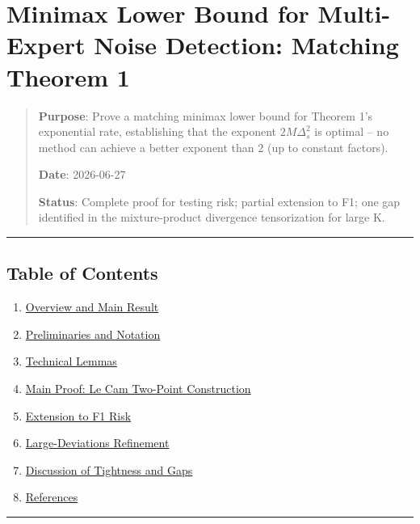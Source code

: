 \documentclass[
  12pt,
]{ctexart}
\author{SCX}
\date{2026}
\providecommand{\tightlist}{%
  \setlength{\itemsep}{0pt}\setlength{\parskip}{0pt}}
\begin{document}
\section{Minimax Lower Bound for Multi-Expert Noise Detection: Matching
Theorem
1}\label{minimax-lower-bound-for-multi-expert-noise-detection-matching-theorem-1}

\begin{quote}
\textbf{Purpose}: Prove a matching minimax lower bound for Theorem 1's
exponential rate, establishing that the exponent \(2M\Delta_s^2\) is
optimal -- no method can achieve a better exponent than \(2\) (up to
constant factors).

\textbf{Date}: 2026-06-27

\textbf{Status}: Complete proof for testing risk; partial extension to
F1; one gap identified in the mixture-product divergence tensorization
for large K.
\end{quote}

\begin{center}\rule{0.5\linewidth}{0.5pt}\end{center}

\subsection{Table of Contents}\label{table-of-contents}

\begin{enumerate}
\def\labelenumi{\arabic{enumi}.}
\tightlist
\item
  \hyperref[1-overview-and-main-result]{Overview and Main Result}
\item
  \hyperref[2-preliminaries-and-notation]{Preliminaries and Notation}
\item
  \hyperref[3-technical-lemmas]{Technical Lemmas}
\item
  \hyperref[4-main-proof-le-cam-two-point-construction]{Main Proof: Le
  Cam Two-Point Construction}
\item
  \hyperref[5-extension-to-f1-risk]{Extension to F1 Risk}
\item
  \hyperref[6-large-deviations-refinement]{Large-Deviations Refinement}
\item
  \hyperref[7-discussion-of-tightness-and-gaps]{Discussion of Tightness
  and Gaps}
\item
  \hyperref[8-references]{References}
\end{enumerate}

\begin{center}\rule{0.5\linewidth}{0.5pt}\end{center}
\end{document}
